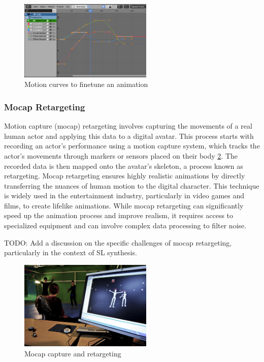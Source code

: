 \documentclass[../../main.tex]{subfiles}
\begin{document}
\begin{figure}
  \centering \includegraphics[width = 2.5in]{chapters/background_work/images/motion_curves.png}
  \caption{Motion curves to finetune an animation}
  \label{fig:motion_curves}
\end{figure}

\subsubsection{Mocap Retargeting}

Motion capture (mocap) retargeting involves capturing the movements of a real human actor and applying this data to a digital avatar. This process starts with recording an actor’s performance using a motion capture system, which tracks the actor’s movements through markers or sensors placed on their body \ref{fig:mocap}. The recorded data is then mapped onto the avatar’s skeleton, a process known as retargeting. Mocap retargeting ensures highly realistic animations by directly transferring the nuances of human motion to the digital character. This technique is widely used in the entertainment industry, particularly in video games and films, to create lifelike animations. While mocap retargeting can significantly speed up the animation process and improve realism, it requires access to specialized equipment and can involve complex data processing to filter noise.

TODO: Add a discussion on the specific challenges of mocap retargeting, particularly in the context of SL synthesis.

\begin{figure}
  \centering \includegraphics[width = 2.5in]{chapters/background_work/images/mocap.png}
  \caption{Mocap capture and retargeting}
  \label{fig:mocap}
\end{figure}
\end{document}

